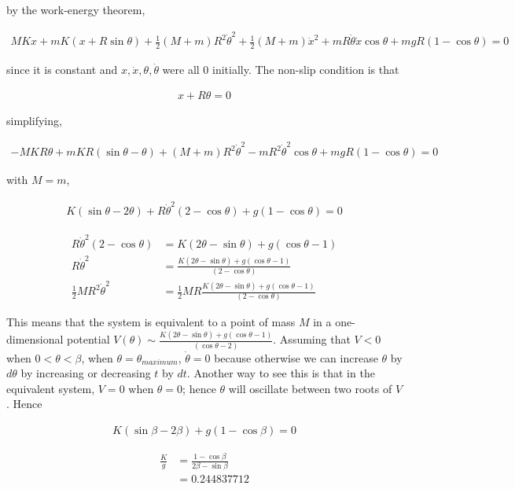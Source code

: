 \documentclass{article}
\newcommand{\half}{\frac{1}{2}}
\begin{document}
by the work-energy theorem,

\begin{align*}
MKx + mK(x + R\sin\theta) + \half (M+m) R^2 \dot{\theta}^2 + \half (M+m) \dot{x}^2 + mR\dot\theta \dot x\cos\theta + mgR(1 - \cos\theta) = 0
\end{align*}

since it is constant and $x, \dot{x}, \theta, \dot{\theta}$ were all 0 initially. The non-slip condition is that

\begin{align*}
x + R\theta = 0
\end{align*}

simplifying,

\begin{align*}
-MKR\theta + mKR(\sin\theta - \theta) + (M+m) R^2 \dot{\theta}^2 - mR^2\dot\theta^2\cos\theta + mgR(1 - \cos\theta) = 0
\end{align*}

with $M=m$,

\begin{align*}
K(\sin\theta - 2\theta) + R \dot{\theta}^2 (2 - \cos\theta) + g(1 - \cos\theta) = 0
\end{align*}

\begin{align*}
R \dot{\theta}^2 (2 - \cos\theta) &= K(2\theta - \sin\theta)+ g(\cos\theta - 1) \\
R \dot{\theta}^2 &= \frac{K(2\theta - \sin\theta)+ g(\cos\theta - 1)}{(2 - \cos\theta)} \\
\half MR^2 \dot{\theta}^2 &= \half MR \frac{K(2\theta - \sin\theta)+ g(\cos\theta - 1)}{(2 - \cos\theta)}
\end{align*}

This means that the system is equivalent to a point of mass $M$ in a one-dimensional potential $V(\theta) \sim \frac{K(2\theta - \sin\theta)+ g(\cos\theta - 1)}{(\cos\theta - 2)}$. Assuming that $V < 0$ when $0 < \theta < \beta$, when $\theta = \theta_{maximum}$, $\dot\theta = 0$ because otherwise we can increase $\theta$ by $d\theta$ by increasing or decreasing $t$ by $dt$. Another way to see this is that in the equivalent system, $V = 0$ when $\theta = 0$; hence $\theta$ will oscillate between two roots of $V$. Hence

\begin{align*}
K(\sin\beta - 2\beta) + g(1 - \cos\beta) = 0
\end{align*}

\begin{align*}
\frac{K}{g} &= \frac{1 - \cos\beta}{2\beta - \sin\beta} \\
&= 0.244837712
\end{align*}
\end{document}
